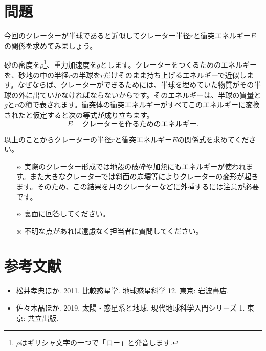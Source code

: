 \documentclass[a4paper]{ltjsarticle}
\begin{document}
\section{問題}
今回のクレーターが半球であると近似してクレーター半径$r$と衝突エネルギー$E$の関係を求めてみましょう。

砂の密度を$\rho$\footnote{$\rho$はギリシャ文字の一つで「ロー」と発音します.}、重力加速度を$g$とします。クレーターをつくるためのエネルギーを、砂地の中の半径$r$の半球を$r$だけそのまま持ち上げるエネルギーで近似します。なぜならば、クレーターができるためには、半球を埋めていた物質がその半球の外に出ていかなければならないからです。そのエネルギーは、半球の質量と$g$と$r$の積で表されます。衝突体の衝突エネルギーがすべてこのエネルギーに変換されたと仮定すると次の等式が成り立ちます。
\begin{equation}
    E = クレーターを作るためのエネルギー.
\end{equation}

以上のことからクレーターの半径$r$と衝突エネルギー$E$の関係式を求めてください。
\vspace{-0.8em}
\begin{itemize}
    \item[※] 実際のクレーター形成では地殻の破砕や加熱にもエネルギーが使われます。また大きなクレーターでは斜面の崩壊等によりクレーターの変形が起きます。そのため、この結果を月のクレーターなどに外挿するには注意が必要です。
    \item[※]裏面に回答してください。
    \item[※]不明な点があれば遠慮なく担当者に質問してください。
\end{itemize}

\section*{参考文献}
\begin{itemize}
    \item 松井孝典ほか. 2011. 比較惑星学. 地球惑星科学 12. 東京: 岩波書店.
    \item 佐々木晶ほか. 2019. 太陽・惑星系と地球. 現代地球科学入門シリーズ 1. 東京: 共立出版.
\end{itemize}
\end{document}
